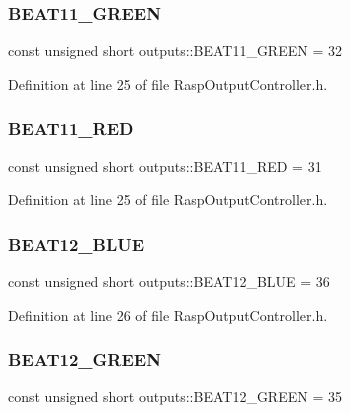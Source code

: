 \subsubsection{\texorpdfstring{B\+E\+A\+T11\+\_\+\+G\+R\+E\+EN}{BEAT11\_GREEN}}
{\footnotesize\ttfamily const unsigned short outputs\+::\+B\+E\+A\+T11\+\_\+\+G\+R\+E\+EN = 32}



Definition at line 25 of file Rasp\+Output\+Controller.\+h.

\mbox{\label{namespaceoutputs_a3b55bd1a681764d7655dfee327930872}} 
\subsubsection{\texorpdfstring{B\+E\+A\+T11\+\_\+\+R\+ED}{BEAT11\_RED}}
{\footnotesize\ttfamily const unsigned short outputs\+::\+B\+E\+A\+T11\+\_\+\+R\+ED = 31}



Definition at line 25 of file Rasp\+Output\+Controller.\+h.

\mbox{\label{namespaceoutputs_ae7b144325945c1712151bf0d6a363c5f}} 
\subsubsection{\texorpdfstring{B\+E\+A\+T12\+\_\+\+B\+L\+UE}{BEAT12\_BLUE}}
{\footnotesize\ttfamily const unsigned short outputs\+::\+B\+E\+A\+T12\+\_\+\+B\+L\+UE = 36}



Definition at line 26 of file Rasp\+Output\+Controller.\+h.

\mbox{\label{namespaceoutputs_a863de14249bb5dd32b6fb2dd665f804e}} 
\subsubsection{\texorpdfstring{B\+E\+A\+T12\+\_\+\+G\+R\+E\+EN}{BEAT12\_GREEN}}
{\footnotesize\ttfamily const unsigned short outputs\+::\+B\+E\+A\+T12\+\_\+\+G\+R\+E\+EN = 35}



